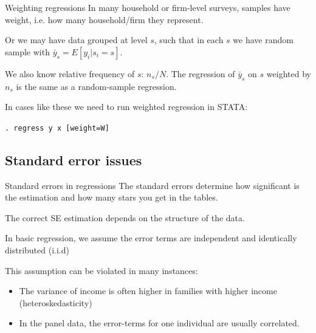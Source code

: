 \documentclass{beamer}
\begin{document}
\begin{frame}{Weighting regressions}
In many household or firm-level surveys, samples have weight, i.e. how many household/firm they represent. 
\bigskip

Or we may have data grouped at level $s$, such that %
in each $s$ we have random sample with $\bar{y}_s=E[y_i|s_i=s]$.\bigskip

We also know relative frequency of $s$: $n_s/N$. The regression of $\bar{y}_s$ on $s$ weighted by $n_s$ is the same as a random-sample regression.
\bigskip

In cases like these we need to run weighted regression in STATA:

{\texttt{. regress y x [weight=W]} } 
\end{frame}

\subsection{Standard error issues}

\begin{frame}{Standard errors in regressions}
The standard errors determine how significant is the estimation and how many stars you get in the tables.\bigskip

The correct SE estimation depends on the structure of the data.\bigskip

In basic regression, we assume the error terms are independent and identically distributed (i.i.d)\bigskip

This assumption can be violated in many instances:
\begin{itemize}
\item The variance of income is often higher in families with higher income (heteroskedasticity)
\item In the panel data, the error-terms for one individual are usually correlated.
\end{itemize}

\end{frame}
\end{document}

